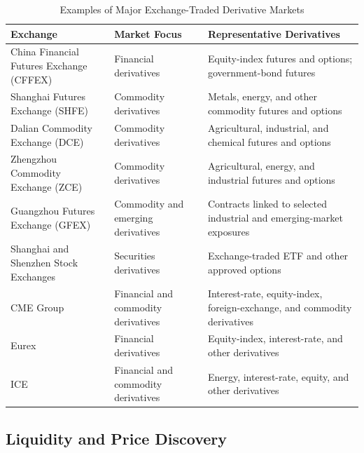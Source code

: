 \begin{table}[H]
\centering
\caption{Examples of Major Exchange-Traded Derivative Markets}
\label{tab:ch11-major-derivative-exchanges}

\begin{tabularx}{\textwidth}{p{3.8cm} p{3.2cm} X}
\toprule
\textbf{Exchange} &
\textbf{Market Focus} &
\textbf{Representative Derivatives} \\
\midrule

China Financial Futures Exchange (CFFEX) &
Financial derivatives &
Equity-index futures and options; government-bond futures \\

Shanghai Futures Exchange (SHFE) &
Commodity derivatives &
Metals, energy, and other commodity futures and options \\

Dalian Commodity Exchange (DCE) &
Commodity derivatives &
Agricultural, industrial, and chemical futures and options \\

Zhengzhou Commodity Exchange (ZCE) &
Commodity derivatives &
Agricultural, energy, and industrial futures and options \\

Guangzhou Futures Exchange (GFEX) &
Commodity and emerging derivatives &
Contracts linked to selected industrial and emerging-market exposures \\

Shanghai and Shenzhen Stock Exchanges &
Securities derivatives &
Exchange-traded ETF and other approved options \\

\addlinespace
CME Group &
Financial and commodity derivatives &
Interest-rate, equity-index, foreign-exchange, and commodity derivatives \\

Eurex &
Financial derivatives &
Equity-index, interest-rate, and other derivatives \\

ICE &
Financial and commodity derivatives &
Energy, interest-rate, equity, and other derivatives \\

\bottomrule
\end{tabularx}
\end{table}

\subsection{Liquidity and Price Discovery}

